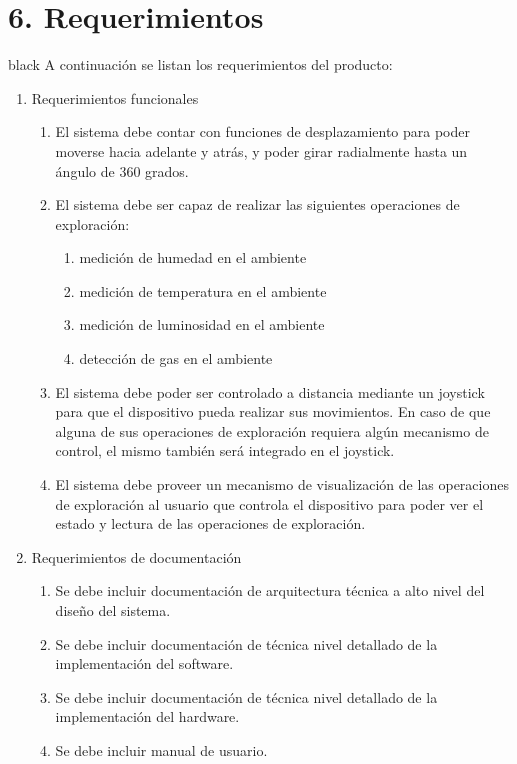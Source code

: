 \documentclass[
11pt, %
codirector, %
]{charter}
\begin{document}
\section{6. Requerimientos}
\label{sec:requerimientos}
\begin{consigna}{black}
A continuación se listan los requerimientos del producto:
\begin{enumerate}	
	\item Requerimientos funcionales		
	\begin{enumerate}			
		\item El sistema debe contar con funciones de desplazamiento para poder moverse hacia adelante y atrás, y poder girar radialmente hasta un ángulo de 360 grados.			
		\item El sistema debe ser capaz de realizar las siguientes operaciones de exploración:			
			\begin{enumerate}				
				\item medición de humedad en el ambiente				
				\item medición de temperatura en el ambiente				
				\item medición de luminosidad en el ambiente				
				\item detección de gas en el ambiente			
			\end{enumerate}			
		\item El sistema debe poder ser controlado a distancia mediante un joystick para que el dispositivo pueda realizar sus movimientos. En caso de que alguna de sus operaciones de exploración requiera algún mecanismo de control, el mismo también será integrado en el joystick.		
		\item El sistema debe proveer un mecanismo de visualización de las operaciones de exploración al usuario que controla el dispositivo para poder ver el estado y lectura de las operaciones de exploración.		
		\end{enumerate}	
	\item Requerimientos de documentación		
		\begin{enumerate}			
			\item Se debe incluir documentación de arquitectura técnica a alto nivel del diseño del sistema.			
			\item Se debe incluir documentación de técnica nivel detallado de la implementación del software.			
			\item Se debe incluir documentación de técnica nivel detallado de la implementación del hardware.			
			\item Se debe incluir manual de usuario.		

\end{enumerate}
\end{enumerate}
\end{consigna}
\end{document}
